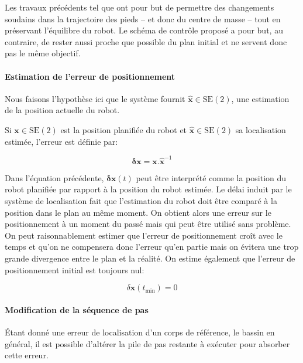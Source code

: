 Les travaux précédents tel que \cite{04humanoids.harada,
  07icra.morisawa} ont pour but de permettre des changements soudains
dans la trajectoire des pieds -- et donc du centre de masse -- tout en
préservant l'équilibre du robot. Le schéma de contrôle proposé a pour
but, au contraire, de rester aussi proche que possible du plan initial
et ne servent donc pas le même objectif.


\paragraph{Estimation de l'erreur de positionnement}

Nous faisons l'hypothèse ici que le système fournit
\mbox{$\hat{\mathbf{x}} \in \text{SE}(2)$}, une estimation de la
position actuelle du robot.

Si $\mathbf{x} \in \text{SE}(2)$ est la position planifiée du robot et
$\hat{\mathbf{x}} \in \text{SE}(2)$ sa localisation estimée, l'erreur
est définie par:

\begin{equation}\label{eq:errorpos}
  \mathbf{\delta x} = \mathbf{x} . \hat{\mathbf{x}}^{-1}
\end{equation}

Dans l'équation précédente, $\mathbf{\delta x}(t)$ peut être
interprété comme la position du robot planifiée par rapport à la
position du robot estimée. Le délai induit par le système de
localisation fait que l'estimation du robot doit être comparé à la
position dans le plan au même moment. On obtient alors une erreur sur
le positionnement à un moment du passé mais qui peut être utilisé sans
problème. On peut raisonnablement estimer que l'erreur de
positionnement croît avec le temps et qu'on ne compensera donc
l'erreur qu'en partie mais on évitera une trop grande divergence entre
le plan et la réalité. On estime également que l'erreur de
positionnement initial est toujours nul:

\begin{equation}\label{eq:errorpos_prop}
\delta \mathbf{x}(t_{\text{min}}) = 0
\end{equation}

\paragraph{Modification de la séquence de pas}

Étant donné une erreur de localisation d'un corps de référence, le
bassin en général, il est possible d'altérer la pile de pas restante à
exécuter pour absorber cette erreur.

